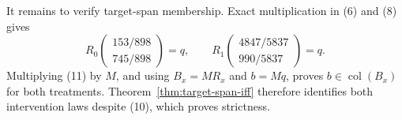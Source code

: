 It remains to verify target-span membership. Exact multiplication in (6) and (8) gives
\[
R_0
\begin{pmatrix}153/898\\745/898\end{pmatrix}
=q,
\qquad
R_1
\begin{pmatrix}4847/5837\\990/5837\end{pmatrix}
=q.
\tag{11}
\]
Multiplying (11) by \(M\), and using \(B_x=MR_x\) and \(b=Mq\), proves \(b\in\operatorname{col}(B_x)\) for both treatments. Theorem~\ref{thm:target-span-iff} therefore identifies both intervention laws despite (10), which proves strictness.